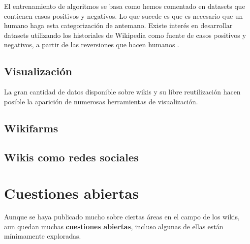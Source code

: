 \documentclass[11pt,onecolumn]{article}
\begin{document}

El entrenamiento de algoritmos se basa como hemos comentado en datasets que contienen casos positivos y negativos. Lo que sucede es que es necesario que un humano haga esta categorización de antemano. Existe interés en desarrollar datasets utilizando los historiales de Wikipedia como fuente de casos positivos y negativos, a partir de las reversiones que hacen humanos \citep{west2010}.

 \citep{avbot2011}
 \citep{avbot2010}
 \citep{avbot2009}

\subsection{Visualización}

La gran cantidad de datos disponible sobre wikis y su libre reutilización hacen posible la aparición de numerosas herramientas de visualización.




\subsection{Wikifarms}


 \citep{kittur2010}

\subsection{Wikis como redes sociales}


\clearpage

\section{Cuestiones abiertas}


Aunque se haya publicado mucho sobre ciertas áreas en el campo de los wikis, aun quedan muchas \textbf{cuestiones abiertas}, incluso algunas de ellas están mínimamente exploradas.
\end{document}
